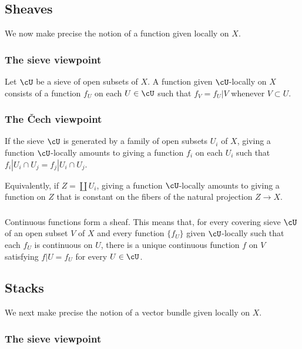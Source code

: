 \documentclass[12pt,oneside,english]{smfbook}
\begin{document}
\subsection{Sheaves}\label{I:1-2}

We now make precise the notion of a function given locally on $X$.

\subsubsection{The sieve viewpoint}\label{I:1-2-1}

Let $\cU$ be a sieve of open subsets of $X$. A function given $\cU$-locally on $X$ consists of a function $f_U$ on each $U\in\cU$ such that $f_V=f_U|V$ whenever $V\subset U$.

\subsubsection{The Čech viewpoint}\label{I:1-2-2}

If the sieve $\cU$ is generated by a family of open subsets $U_i$ of $X$, giving a function $\cU$-locally amounts to giving a function $f_i$ on each $U_i$ such that $f_i|{U_i\cap U_j}=f_j|{U_i\cap U_j}$.

Equivalently, if $Z=\coprod U_i$, giving a function $\cU$-locally amounts to giving a function on $Z$ that is constant on the fibers of the natural projection $Z\to X$.

\subsubsection{}\label{I:1-2-3}

Continuous functions form a sheaf. This means that, for every covering sieve $\cU$ of an open subset $V$ of $X$ and every function $\{f_U\}$ given $\cU$-locally such that each $f_U$ is continuous on $U$, there is a unique continuous function $f$ on $V$ satisfying $f|U=f_U$ for every $U\in\cU$.

\subsection{Stacks}\label{I:1-3}

We next make precise the notion of a vector bundle given locally on $X$.

\subsubsection{The sieve viewpoint}\label{I:1-3-1}
\end{document}
